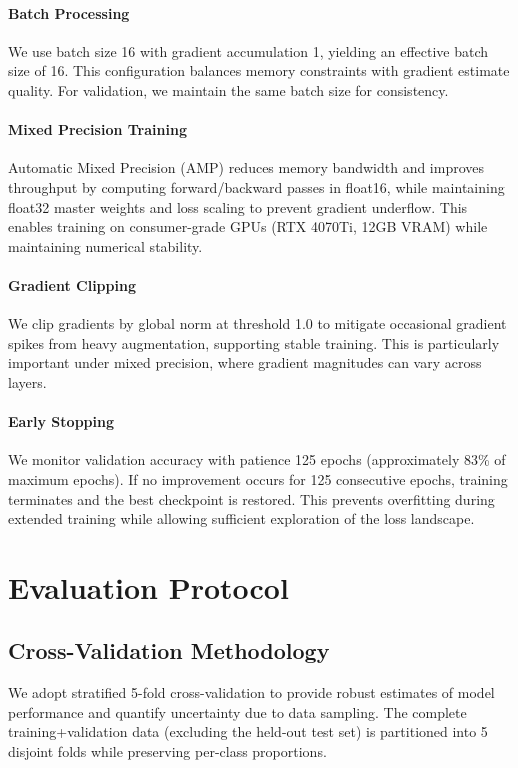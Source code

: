 \documentclass[11pt,a4paper]{article}
\begin{document}
\paragraph{Batch Processing} We use batch size 16 with gradient accumulation 1, yielding an effective batch size of 16. This configuration balances memory constraints with gradient estimate quality. For validation, we maintain the same batch size for consistency.

\paragraph{Mixed Precision Training} Automatic Mixed Precision (AMP) \cite{micikevicius2018mixedprecision} reduces memory bandwidth and improves throughput by computing forward/backward passes in float16, while maintaining float32 master weights and loss scaling to prevent gradient underflow. This enables training on consumer-grade GPUs (RTX 4070Ti, 12GB VRAM) while maintaining numerical stability.

\paragraph{Gradient Clipping} We clip gradients by global norm at threshold 1.0 to mitigate occasional gradient spikes from heavy augmentation, supporting stable training. This is particularly important under mixed precision, where gradient magnitudes can vary across layers.

\paragraph{Early Stopping} We monitor validation accuracy with patience 125 epochs (approximately 83\% of maximum epochs). If no improvement occurs for 125 consecutive epochs, training terminates and the best checkpoint is restored. This prevents overfitting during extended training while allowing sufficient exploration of the loss landscape.

\section{Evaluation Protocol}
\label{sec:evaluation}

\subsection{Cross-Validation Methodology}

We adopt stratified 5-fold cross-validation \cite{kohavi1995cv} to provide robust estimates of model performance and quantify uncertainty due to data sampling. The complete training+validation data (excluding the held-out test set) is partitioned into 5 disjoint folds while preserving per-class proportions.
\end{document}
